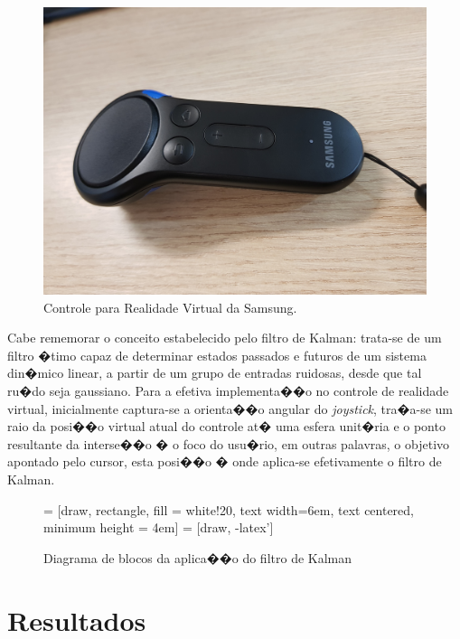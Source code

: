 \documentclass[12pt]{article}
\begin{document}
\begin{figure}[ht]
\centering
\includegraphics[width=.4\textwidth]{images/gear_controller.jpg}
\caption{Controle para Realidade Virtual da Samsung.}
\label{fig:vrcontroller}
\end{figure}

Cabe rememorar o conceito estabelecido pelo filtro de Kalman: trata-se de um filtro �timo capaz de determinar estados passados e futuros de um sistema din�mico linear, a partir de um grupo de entradas ruidosas, desde que tal ru�do seja gaussiano. Para a efetiva implementa��o no controle de realidade virtual, inicialmente captura-se a orienta��o angular do \textit{joystick}, tra�a-se um raio da posi��o virtual atual do controle at� uma esfera unit�ria e o ponto resultante da interse��o � o foco do usu�rio, em outras palavras, o objetivo apontado pelo cursor, esta posi��o � onde aplica-se efetivamente o filtro de Kalman. 

\begin{figure}[H]
\centering
{} = [draw, rectangle, fill = white!20, text width=6em, text centered, minimum height = 4em]
 = [draw, -latex']

\caption{Diagrama de blocos da aplica��o do filtro de Kalman} \label{fig:system_blocks}
\end{figure}

\section{Resultados} \label{sec:results}
\end{document}
